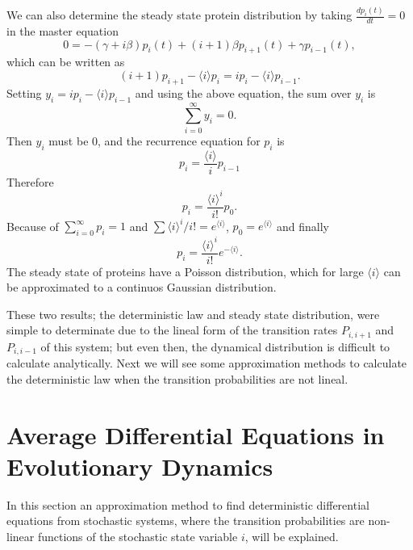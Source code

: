 We can also determine the steady state protein distribution by taking $\frac{dp_i(t)}{dt}=0$ in the master equation
\begin{equation}
0=-(\gamma + i\beta)p_i(t) + (i+1)\beta p_{i+1}(t) + \gamma p_{i-1}(t),
\end{equation}
which can be written as
\begin{equation}
(i+1)p_{i+1}-\langle i\rangle p_i = i p_i - \langle i \rangle p_{i-1}.
\end{equation} 
 Setting $y_i=i p_i - \langle i \rangle p_{i-1}$ and using the above equation, the sum over $y_i$ is
\begin{equation}
\sum\limits_{i=0}^{\infty}y_i =0.
\end{equation} 
Then $y_i$ must be $0$, and the recurrence equation for $p_i$ is
\begin{equation}
p_i = \frac{\langle i \rangle}{i} p_{i-1}
\end{equation}
Therefore
\begin{equation}
p_i=\frac{\langle i\rangle^i}{i!}p_0.
\end{equation}
Because of $\sum\limits_{i=0}^{\infty}p_i=1$ and $\sum\langle i \rangle^i / i!=e^{\langle i \rangle}$, $p_0=e^{\langle i \rangle}$ and finally
\begin{equation}
p_i =\frac{\langle i \rangle ^i}{i!}e^{-\langle i\rangle}.
\end{equation}
 The steady state of proteins have a Poisson distribution, which for large $\langle i \rangle$ can be approximated to a continuos Gaussian distribution.
   
These two results; the deterministic law and steady state distribution, were simple to determinate due to the lineal form of the transition rates $P_{i,i+1}$ and $P_{i,i-1}$ of this system; but even then, the dynamical distribution is difficult to calculate analytically. Next we will see some approximation methods to calculate the deterministic law when the transition probabilities are not lineal.  
\section{Average Differential Equations in Evolutionary Dynamics}
In this section  an approximation method to find deterministic differential equations from stochastic systems, where the transition probabilities are non-linear functions of the stochastic state variable $i$, will be explained.  

